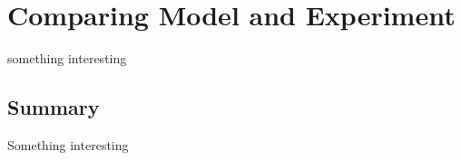 %
\chapter{Comparing Model and Experiment}
\label{chap:2_ModelAndExperiment}
 \vspace{1cm}
\begin{learningObjectives}
\item something interesting
\end{learningObjectives}


\newpage
\section{Summary}
\vspace{2cm}
\begin{chapterSummary}
\item Something interesting
\end{chapterSummary}
